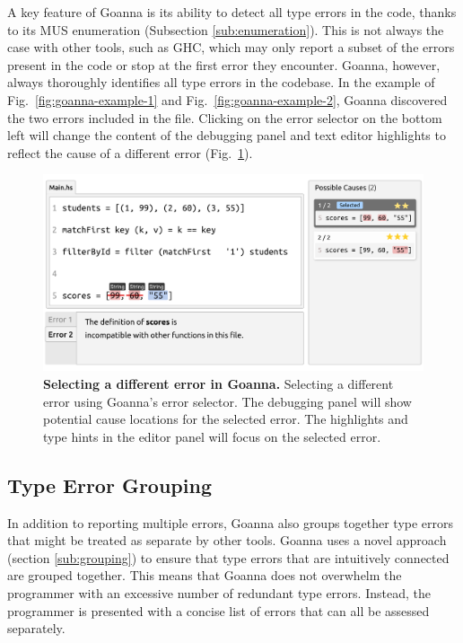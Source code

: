 \documentclass[pdflatex,lineno,sn-nature,Numbered]{sn-jnl}%
\begin{document}
    A key feature of Goanna is its ability to detect all type errors in the code, thanks to its MUS enumeration (Subsection \ref{sub:enumeration}). This is not always the case with other tools, such as GHC, which may only report a subset of the errors present in the code or stop at the first error they encounter. Goanna, however, always thoroughly identifies all type errors in the codebase. In the example of Fig.~\ref{fig:goanna-example-1} and Fig.~\ref{fig:goanna-example-2}, Goanna discovered the two errors included in the file. Clicking on the error selector on the bottom left will change the content of the debugging panel and text editor highlights to reflect the cause of a different error (Fig.~\ref{fig:multi-error}). 

    \begin{figure}[ht!]
        \centering
        \includegraphics[width=\linewidth]{images/Goanna-Multi-Error.pdf}
        \caption[Selecting a different error in Goanna]{\textbf{Selecting a different error in Goanna.} Selecting a different error using Goanna's error selector. The debugging panel will show potential cause locations for the selected error. The highlights and type hints in the editor panel will focus on the selected error.}
        \label{fig:multi-error}
    \end{figure}


    \subsection{Type Error Grouping}  \label{sub:group}
    In addition to reporting multiple errors, Goanna also groups together type errors that might be treated as separate by other tools. Goanna uses a novel approach (section \ref{sub:grouping}) to ensure that type errors that are intuitively connected are grouped together. This means that Goanna does not overwhelm the programmer with an excessive number of redundant type errors. Instead, the programmer is presented with a concise list of errors that can all be assessed separately.
\end{document}
